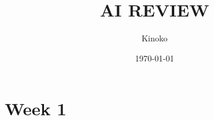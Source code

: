 \documentclass{paper}
\title{AI REVIEW}
\author{Kinoko}
\date{\today}
\begin{document}
\begin{titlepage}  %
    \maketitle
\end{titlepage}

\section{Week 1}
\end{document}
